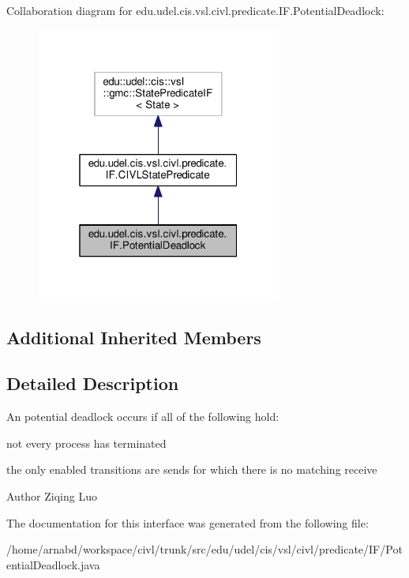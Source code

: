Collaboration diagram for edu.\+udel.\+cis.\+vsl.\+civl.\+predicate.\+I\+F.\+Potential\+Deadlock\+:
\nopagebreak
\begin{figure}[H]
\begin{center}
\leavevmode
\includegraphics[width=229pt]{interfaceedu_1_1udel_1_1cis_1_1vsl_1_1civl_1_1predicate_1_1IF_1_1PotentialDeadlock__coll__graph}
\end{center}
\end{figure}
\subsection*{Additional Inherited Members}


\subsection{Detailed Description}
An potential deadlock occurs if all of the following hold\+: 


\begin{DoxyEnumerate}
\item not every process has terminated 
\item the only enabled transitions are sends for which there is no matching receive 
\end{DoxyEnumerate}

\begin{DoxyAuthor}{Author}
Ziqing Luo 
\end{DoxyAuthor}


The documentation for this interface was generated from the following file\+:\begin{DoxyCompactItemize}
\item 
/home/arnabd/workspace/civl/trunk/src/edu/udel/cis/vsl/civl/predicate/\+I\+F/Potential\+Deadlock.\+java\end{DoxyCompactItemize}
